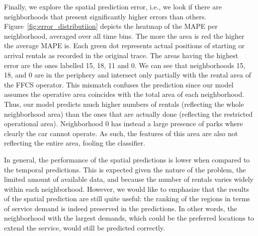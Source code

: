 Finally, we explore the spatial prediction error, i.e., we look if there are neighborhoods that present significantly higher errors than others.
Figure~\ref{fig:error_distributiion} depicts the heatmap of the MAPE per neighborhood, averaged over all time bins. The more the area is red the higher the average MAPE is. Each green dot represents actual positions of starting or arrival rentals as recorded in the original trace.
The areas having the highest error are the ones labelled 15, 18, 11 and 0. We can see that neighborhoods 15, 18, and 0 are in the periphery and intersect only partially with the rental area of the FFCS operator. This mismatch confuses the prediction since our model assumes the operative area coincides with the total area of each neighborhood. Thus, our model predicts much higher numbers of rentals (reflecting the whole neighborhood area) than the ones that are actually done (reflecting the restricted operational area). Neighborhood 0 has instead a large presence of parks where clearly the car cannot operate. As such, the features of this area are also not reflecting the entire area, fooling the classifier.

In general, the performance of the spatial predictions is lower when compared to the temporal predictions. This is expected given the nature of the problem, the limited amount of available data, and because the number of rentals varies widely within each neighborhood. However, we would like to emphasize that the results of the spatial prediction are still quite useful: the ranking of the regions in terms of service demand is indeed preserved in the predictions. In other words, the neighborhood with the largest demands, which could be the preferred locations to extend the service, would still be predicted correctly.



